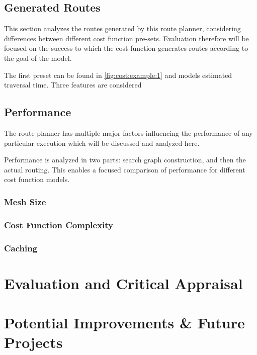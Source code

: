 \documentclass[12pt]{article}
\begin{document}
\subsection{Generated Routes}

This section analyzes the routes generated by this route planner, considering differences between different cost function pre-sets. Evaluation therefore will be focused on the success to which the cost function generates routes according to the goal of the model.

The first preset can be found in \autoref{fig:cost:example:1} and models estimated traversal time. Three features are considered

\subsection{Performance}

The route planner has multiple major factors influencing the performance of any particular execution which will be discussed and analyzed here.

Performance is analyzed in two parts: search graph construction, and then the actual routing. This enables a focused comparison of performance for different cost function models.

\subsubsection{Mesh Size}

\subsubsection{Cost Function Complexity}

\subsubsection{Caching}

\section{Evaluation and Critical Appraisal}

\section{Potential Improvements \& Future Projects}
\end{document}
